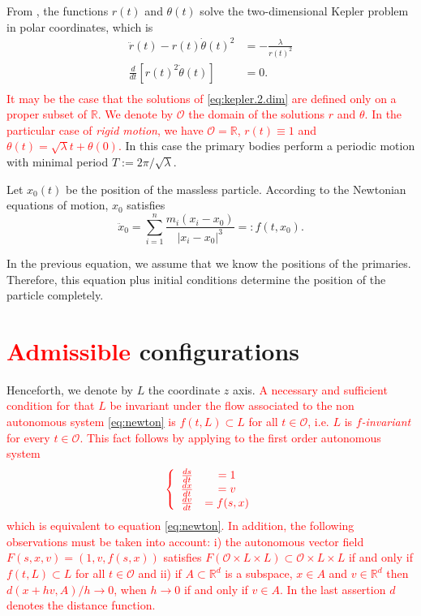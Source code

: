 \documentclass[smallcondensed]{svjour3}
\newcommand{\rr}{\mathbb{R}}
\begin{document}
From \cite[Eq. (2.16)]{JaumeLlibre276},  the functions $r(t)$ and $\theta (t)$ solve the two-dimensional Kepler problem in polar coordinates, which is 
\begin{equation}
 \begin{array}{rl}\label{eq:kepler.2.dim}
\ddot{r}(t)-r(t)\dot{\theta}(t)^2 & = -\frac{\lambda}{r(t)^2}\\
\frac{d }{dt}\left[ r(t)^2\dot{\theta}(t)\right] & =0.\\
\end{array}
\end{equation}
\textcolor{red}{It may be the case that the solutions of \eqref{eq:kepler.2.dim} are defined only on a proper subset of $\rr$. We denote  by $\mathcal{O}$ the domain of the solutions $r$ and $\theta$. In the particular case of \emph{rigid motion}, we have $\mathcal{O}=\rr$,  $r(t)\equiv 1$ and $\theta (t)=\sqrt{\lambda }t +\theta(0)$.} In this case the primary bodies perform a periodic motion with minimal period $T:=2\pi/\sqrt{\lambda }$.

Let $x_0(t)$ be the position of the massless particle.
According to the Newtonian equations of motion, $x_0$ satisfies
\begin{equation}\label{eq:newton}
 \ddot{x}_0=\sum_{i=1}^n\frac{m_i(x_i-x_0)}{|x_i-x_0|^3}=:f(t,x_0).
\end{equation}

In the previous equation, we assume that we know the positions of the primaries. Therefore, this equation plus  initial conditions  determine the position of the particle completely.


\section{\textcolor{red}{Admissible} configurations}\label{sec:admisible.configuraciones}
Henceforth, we denote by $L$ the coordinate $z$ axis.
\textcolor{red}{
 A necessary and sufficient condition for that $L$  be invariant under the  flow associated to the non autonomous system  \eqref{eq:newton} is  $f(t,L)\subset L$ for all $t\in\mathcal{O}$, i.e. $L$ is \emph{$f$-invariant} for every $t\in\mathcal{O}$. This fact follows by applying \cite[Th. 1]{Hai-1970} to the first order autonomous system
}
\[
\textcolor{red}{
 \left\{
  \begin{array}{cc}
   \frac{ds}{dt}&=1\\
   \frac{dx}{dt}&=v\\
   \frac{dv}{dt}&=f(s,x)\\
  \end{array}
 \right.}
\]
\textcolor{red}{which is equivalent to equation  \eqref{eq:newton}. In addition, the following observations must be taken into account: i) the autonomous vector field $F(s,x,v)=(1,v,f(s,x))$ satisfies $F(\mathcal{O}\times L\times L)\subset \mathcal{O}\times L\times L$ if and only if $f(t,L)\subset L$ for all $t\in\mathcal{O}$ and ii) if $A\subset \rr^d$ is a subspace,  $x\in A$ and $v\in\rr^d$ then $d(x+hv,A)/h\to 0$, when $h\to 0$ if and only if $v\in A$. In the last assertion $d$ denotes the distance function.}
\end{document}

